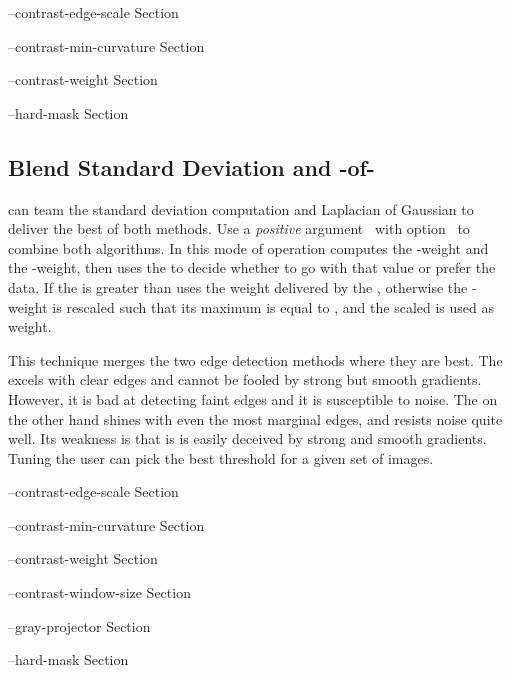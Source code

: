 \begin{optionsummary}
\item[--contrast-edge-scale] Section~
\item[--contrast-min-curvature] Section~
\item[--contrast-weight] Section~
\item[--hard-mask] Section~
\end{optionsummary}


\subsection[Blend \acronym{SDev} and \acronym{LoG}]%
{\label{sec:blend-sdev-and-log}Blend Standard Deviation and
  \hyp{}of\hyp{}}

\App{} can team the standard deviation computation and Laplacian of
Gaussian to deliver the best of both methods.  Use a \emph{positive}
argument~ with
option~ to combine both algorithms.
In this mode of operation \App{} computes the -weight
and the -weight, then uses the  to decide
whether to go with that value or prefer the  data.  If
the  is greater than  \App{} uses the
weight delivered by the , otherwise the
-weight is rescaled such that its maximum is equal to
, and the scaled  is used as weight.

This technique merges the two edge detection methods where they are
best.  The  excels with clear edges and cannot be fooled
by strong but smooth gradients.  However, it is bad at detecting faint
edges and it is susceptible to noise.  The  on the other
hand shines with even the most marginal edges, and resists noise quite
well.  Its weakness is that is is easily deceived by strong and smooth
gradients.  Tuning  the user can pick the best
threshold for a given set of images.

\begin{optionsummary}
\item[--contrast-edge-scale] Section~
\item[--contrast-min-curvature] Section~
\item[--contrast-weight] Section~
\item[--contrast-window-size] Section~
\item[--gray-projector] Section~
\item[--hard-mask] Section~
\end{optionsummary}


